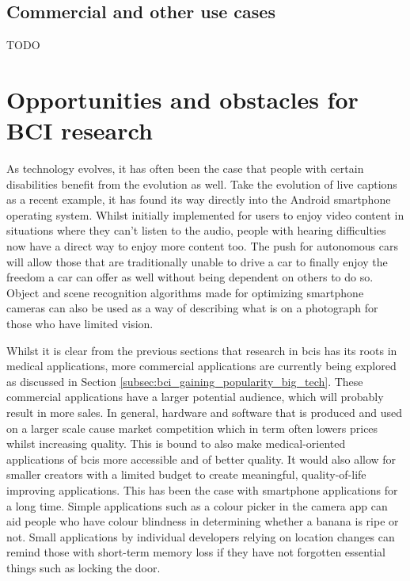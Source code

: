 
\subsection{Commercial and other use cases}
\label{subsec:bci_common_use_commrcial_and_other}
TODO


\section{Opportunities and obstacles for BCI research}
\label{sec:bci_opportunities_obstacles}

As technology evolves, it has often been the case that people with certain disabilities benefit from the evolution as well.
Take the evolution of live captions as a recent example, it has found its way directly into the Android smartphone operating system.
Whilst initially implemented for users to enjoy video content in situations where they can't listen to the audio, people with hearing difficulties now have a direct way to enjoy more content too.
The push for autonomous cars will allow those that are traditionally unable to drive a car to finally enjoy the freedom a car can offer as well without being dependent on others to do so.
Object and scene recognition algorithms made for optimizing smartphone cameras can also be used as a way of describing what is on a photograph for those who have limited vision.

Whilst it is clear from the previous sections that research in \glspl{bci} has its roots in medical applications, more commercial applications are currently being explored as discussed in Section \ref{subsec:bci_gaining_popularity_big_tech}.
These commercial applications have a larger potential audience, which will probably result in more sales.
In general, hardware and software that is produced and used on a larger scale cause market competition which in term often lowers prices whilst increasing quality.
This is bound to also make medical-oriented applications of \glspl{bci} more accessible and of better quality.
It would also allow for smaller creators with a limited budget to create meaningful, quality-of-life improving applications.
This has been the case with smartphone applications for a long time.
Simple applications such as a colour picker in the camera app can aid people who have colour blindness in determining whether a banana is ripe or not.
Small applications by individual developers relying on location changes can remind those with short-term memory loss if they have not forgotten essential things such as locking the door.


